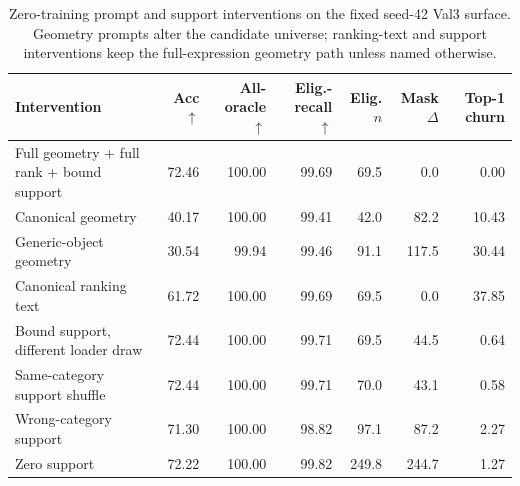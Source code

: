 \begin{table}[t]
\centering
\caption{Zero-training prompt and support interventions on the fixed seed-42 Val3 surface. Geometry prompts alter the candidate universe; ranking-text and support interventions keep the full-expression geometry path unless named otherwise.}
\label{tab:supp-interventions}
\scriptsize
\setlength{\tabcolsep}{4pt}
\begin{tabular}{lrrrrrr}\toprule
Intervention & Acc$\uparrow$ & All-oracle$\uparrow$ & Elig.-recall$\uparrow$ & Elig. $n$ & Mask $\Delta$ & Top-1 churn\\\midrule
Full geometry + full rank + bound support & 72.46 & 100.00 & 99.69 & 69.5 & 0.0 & 0.00 \\
Canonical geometry & 40.17 & 100.00 & 99.41 & 42.0 & 82.2 & 10.43 \\
Generic-object geometry & 30.54 & 99.94 & 99.46 & 91.1 & 117.5 & 30.44 \\
Canonical ranking text & 61.72 & 100.00 & 99.69 & 69.5 & 0.0 & 37.85 \\
Bound support, different loader draw & 72.44 & 100.00 & 99.71 & 69.5 & 44.5 & 0.64 \\
Same-category support shuffle & 72.44 & 100.00 & 99.71 & 70.0 & 43.1 & 0.58 \\
Wrong-category support & 71.30 & 100.00 & 98.82 & 97.1 & 87.2 & 2.27 \\
Zero support & 72.22 & 100.00 & 99.82 & 249.8 & 244.7 & 1.27 \\
\bottomrule\end{tabular}
\end{table}
